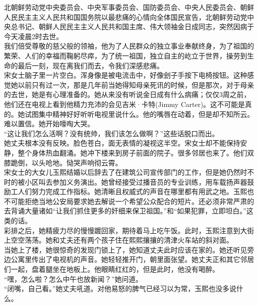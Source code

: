 \begin{multicols}{\theparacolNo}
北朝鲜劳动党中央委员会、中央军事委员会、国防委员会、中央人民委员会、朝鲜人民民主主义人民共和国国务院以最悲痛的心情向全体国民宣告，北朝鲜劳动党中央总书记、朝鲜人民民主主义人民共和国主席、伟大领袖金日成同志，突然因病于今天凌晨2时去世。\\

我们倍受尊敬的慈父般的领袖，他为了人民群众的独立事业奉献终身，为了祖国的繁荣、人们的幸福而鞠躬尽瘁，为了统一祖国，独立自主的屹立于世界，操劳到生命的最后一刻，现在离我们而去，令我们深感悲痛。\\

宋女士脑子里一片空白。浑身像是被电流击中，好像刽子手按下电椅按钮。这种感觉她以前只有过一次，那是几年前当她得知母亲死讯的时候，但是那次，对于母亲的去世，她是有心理准备的。她从来没有听说金日成有什么病痛；仅仅3周之前，他们还在电视上看到他精力充沛的会见吉米·卡特(Jimmy Carter)。这不可能是真的。她试图集中精神好好听听电视里说什么。他的嘴唇在动着，但是却不知所云。难以置信。她开始嚎啕大哭。\\

“这让我们怎么活啊？没有统帅，我们该怎么做啊？”这些话脱口而出。\\

她丈夫根本没有反映。脸色苍白，面无表情的凝视这半空。宋女士却不能保持安静，整个身体热血翻涌。她冲下楼来到房子前面的院子。很多邻居也来了。他们双膝跪倒，以头呛地。恸哭声响彻云霄。\\

宋女士的大女儿玉熙结婚以后辞去了在建筑公司宣传部门的工作，但是她仍然时不时的被小区叫去参加义务演出。她曾经接受过播音员的专业训练，用车载扬声器鼓励工人们努力完成工作指标。她清晰且权威式的声音在哪里都有用武之地。玉熙也不可能拒绝当地公安局要求她去解说一个希望公众配合的短片。还必须非常严肃的去背诵大量诸如“让我们抓住更多的奸细来保卫祖国。”和“如果犯罪，立即坦白。”这类的话。\\

彩排之后，她精疲力尽的慢慢踱回家，期待着马上吃午饭。此时，玉熙注意到大街上空空荡荡。她和丈夫还有两个孩子住在熙熙攘攘的清津火车站的斜对面。\\

当她上了楼，她很惊奇的发现门锁上了，她知道丈夫此时应该在家的。她还听见旁边公寓里传出了电视机的声音。她轻轻推开门，朝里面张望。她丈夫正和其它邻居们一起，盘着腿坐在地板上。他眼睛红红的，但是此时，他没有喝醉。\\

“嘿，怎么啦？怎么中午也放新闻？”她问道。\\

“闭嘴，自己看。”她丈夫吼道。对他易怒的脾气已经习以为常，玉熙也没多说什么。\\


\end{multicols}
